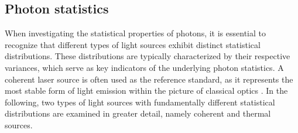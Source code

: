\subsection{Photon statistics}
When investigating the statistical properties of photons, it is essential to recognize that different types of light sources exhibit distinct statistical distributions. These distributions are typically characterized by their respective variances, which serve as key indicators of the underlying photon statistics. A coherent laser source is often used as the reference standard, as it represents the most stable form of light emission within the picture of classical optics \cite{foxQuantumOpticsIntroduction2006}. In the following, two types of light sources with fundamentally different statistical distributions are examined in greater detail, namely coherent and thermal sources.

